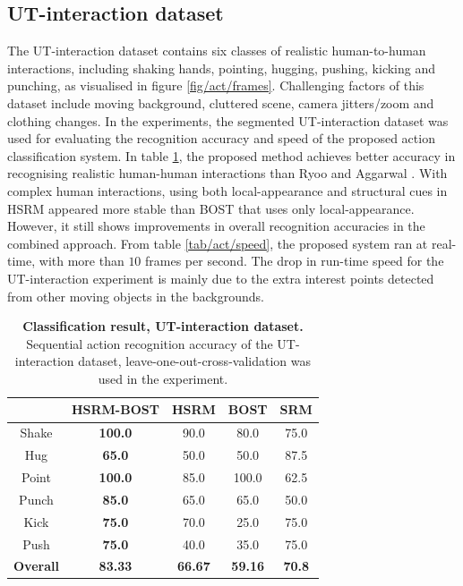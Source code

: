 \subsection{UT-interaction dataset}
The UT-interaction dataset contains six classes of realistic human-to-human interactions, including shaking hands, pointing, hugging, pushing, kicking and punching, as visualised in figure \ref{fig/act/frames}. 
Challenging factors of this dataset include moving background, cluttered scene, camera jitters/zoom and clothing changes. 
In the experiments, the segmented UT-interaction dataset was used for evaluating the recognition accuracy and speed of the proposed action classification system. 
In table \ref{tab/act/utcompare}, the proposed method achieves better accuracy in recognising realistic human-human interactions than Ryoo and Aggarwal \cite{Ryoo2009}. 
With complex human interactions, using both local-appearance and structural cues in HSRM appeared more stable than BOST that uses only local-appearance. 
However, it still shows improvements in overall recognition accuracies in the combined approach. 
From table \ref{tab/act/speed}, the proposed system ran at real-time, with more than $10$ frames per second. 
The drop in run-time speed for the UT-interaction experiment is mainly due to the extra interest points detected from other moving objects in the backgrounds.

\begin{table}
	\centering
	\begin{tabular}{|c|c|c|c|c|}
		\hline 
		\backslashbox{\textbf{Action}}{\textbf{Method}} & \textbf{HSRM-BOST} & \textbf{HSRM} & \textbf{BOST} & \textbf{SRM}\cite{Ryoo2009} \\
		\hline 
		Shake & \textbf{\color{blue}100.0} & 90.0 & 80.0 & 75.0 \\ 
		Hug & \textbf{\color{blue}65.0} & 50.0 & 50.0 & 87.5 \\ 
		Point & \textbf{\color{blue}100.0} & 85.0 & 100.0 & 62.5 \\ 
		Punch & \textbf{\color{blue}85.0} & 65.0 & 65.0 & 50.0 \\ 
		Kick & \textbf{\color{blue}75.0} & 70.0 & 25.0 & 75.0 \\ 
		Push & \textbf{\color{blue}75.0} & 40.0 & 35.0 & 75.0 \\ 
		\hline 	
		\textbf{ Overall } & \textbf{\color{blue}83.33} & \textbf{66.67} & \textbf{59.16} & \textbf{70.8} \\ 
		\hline 
	\end{tabular}
	\caption{\textbf{Classification result, UT-interaction dataset.} Sequential action recognition accuracy of the UT-interaction dataset, leave-one-out-cross-validation was used in the experiment.}
	\label{tab/act/utcompare}
\end{table}

